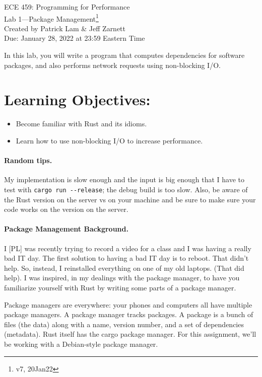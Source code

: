 \documentclass[12pt]{article}
\renewcommand{\_}{\kern-1.5pt\textunderscore\kern-1.5pt}
\begin{document}
\begin{center}
{\Large ECE 459: Programming for Performance}\\
{\Large Lab 1---Package Management\footnote{v7, 20Jan22}}\\[1em]
Created by Patrick Lam \& Jeff Zarnett\\
Due: January 28, 2022 at 23:59 Eastern Time
\end{center}


\vspace{1em}
In this lab, you will write a program that computes dependencies for software packages, and also performs network requests using non-blocking I/O.

\section*{Learning Objectives:}
\begin{itemize}
	\item Become familiar with Rust and its idioms.
	\item Learn how to use non-blocking I/O to increase performance.
\end{itemize}

\paragraph*{Random tips.} My implementation is slow enough and the input is big enough that I have to test with \verb+cargo run --release+; the debug build is too slow. Also, be aware of the Rust version on the server vs on your machine and be sure to make sure your code works on the version on the server.


\paragraph*{Package Management Background.}
I [PL] was recently trying to record a video for a class and I was having a really bad IT day. The first solution to having a bad IT day is to reboot. That didn't help. So, instead, I reinstalled everything on one of my old laptops. (That did help). I was inspired, in my dealings with the package manager, to have you familiarize yourself with Rust by writing some parts of a package manager. \par

\vspace{1em}
Package managers are everywhere: your phones and computers all have multiple package managers. A package manager tracks packages. A package is a bunch of files (the data) along with a name, version number, and a set of dependencies (metadata). Rust itself has the cargo package manager. For this assignment, we'll be working with a Debian-style package manager. \par
\end{document}
